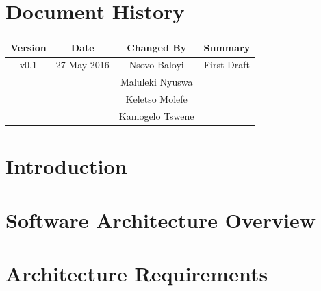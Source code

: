 \documentclass[a4paper,12pt]{article}
\begin{document}
	\newpage
	
	\tableofcontents
	\newpage
	\section*{Document History}
	
	\begin{table}[h!]
		
		\centering %
		\begin{tabular}{c c c c} %
			\hline\hline %
			Version & Date & Changed By & Summary \\ [0.5ex] %
			\hline %
			v0.1 & 27 May 2016 & Nsovo Baloyi & First Draft 
			\\ & & Maluleki Nyuswa &  
			\\ & & Keletso Molefe &
			\\ & & Kamogelo Tswene & \\ [1ex] 
			\hline
		\end{tabular}
		\label{table:nonlin} %
	\end{table}

	\newpage
	
	\section{Introduction}	
	
	
	
	\section{Software Architecture Overview}
	
	
	\section{Architecture Requirements}
	
	
\end{document}

